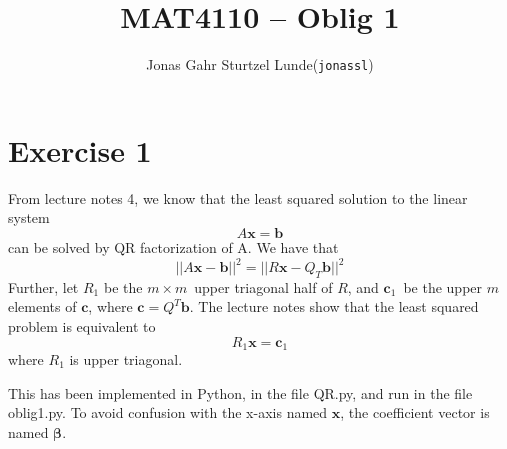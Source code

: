 \documentclass[12p,a4paper]{article}
\renewcommand{\b}{\boldsymbol}
\begin{document}
\title{MAT4110 -- Oblig 1}
\author{
    \begin{tabular}{r l}
        Jonas Gahr Sturtzel Lunde & (\texttt{jonassl})
    \end{tabular}}

\maketitle

\hspace{10cm}

\section*{Exercise 1}
From lecture notes 4, we know that the least squared solution to the linear system
\[
    A\b x = \b b
\]
can be solved by QR factorization of A. We have that
\[
    ||A\b x - \b b||^2 = ||R\b x - Q_T\b b||^2    
\]
Further, let $R_1$ be the $m\times m$ upper triagonal half of $R$, and $\b c_1$ be the upper $m$ elements of $\b c$, where $\b c = Q^T\b b$.
The lecture notes show that the least squared problem is equivalent to
\[
    R_1\b x = \b c_1
\]
where $R_1$ is upper triagonal.

This has been implemented in Python, in the file QR.py, and run in the file oblig1.py. To avoid confusion with the x-axis named $\b x$, the coefficient vector is named $\b \beta$.
\end{document}
